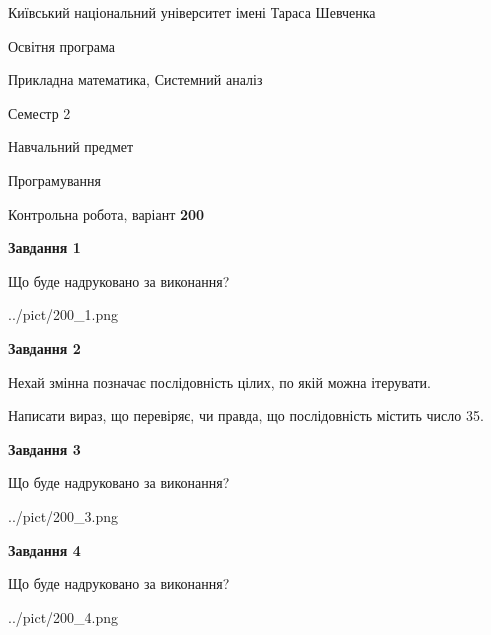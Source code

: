 \documentclass[12pt, ukrainian]{article}
\begin{document}
{{\begin {small}\par
{ \center  Київський національний університет імені Тараса Шевченка \par}
{\parbox {5 cm}{Освітня програма \hfill}{\parbox {8 cm}{Прикладна математика, Системний аналіз \hfill}}\parbox {5 cm}{\hfill Семестр 2}}\par
{\parbox {5 cm} {Навчальний предмет \hfill}\parbox {7 cm}{Програмування \hfill}\parbox {6cm}{\hfill}\par}\vspace{-7pt} \end{small}}{\center Контрольна робота, варіант  \No \textbf
{ 200 }\par}}
{
\begin {large}
{\begin {center}\textbf{Завдання 1}\end {center}}\par
Що буде надруковано за виконання?\par\par
\begin{center}
	{../pict/200_1.png}
\end{center}
\newpage

{\begin {center}\textbf{Завдання 2}\end {center}}\par
Нехай змінна  позначає послідовність цілих, по якій можна ітерувати.

Написати вираз, що перевіряє, чи правда, що послідовність  містить число 35.\par
\newpage

{\begin {center}\textbf{Завдання 3}\end {center}}\par
Що буде надруковано за виконання?\par
\begin{center}
	{../pict/200_3.png}
\end{center}
\newpage

{\begin {center}\textbf{Завдання 4}\end {center}}\par
Що буде надруковано за виконання?\par
\begin{center}
	{../pict/200_4.png}
\end{center}
\newpage


\end{large}}
\end{document}
